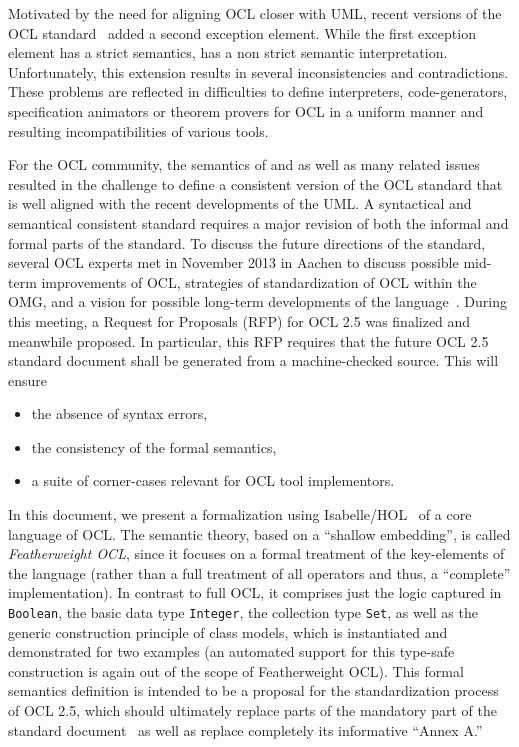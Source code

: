 Motivated by the need for aligning OCL closer with UML, recent
versions of the OCL standard~\cite{omg:ocl:2006,omg:ocl:2012} added a
second exception element.  While the first exception element
 has a strict semantics,  has a non
strict semantic interpretation.  Unfortunately, this extension results
in several inconsistencies and contradictions. These problems are
reflected in difficulties to define interpreters, code-generators,
specification animators or theorem provers for OCL in a uniform manner
and resulting incompatibilities of various tools.

For the OCL community, the semantics of  and
 as well as many related issues resulted in the
challenge to define a consistent version of the OCL standard that is
well aligned with the recent developments of the UML\@. A syntactical
and semantical consistent standard requires a major revision of both
the informal and formal parts of the standard. To discuss the future
directions of the standard, several OCL experts met in November 2013
in Aachen to discuss possible mid-term improvements of OCL, strategies
of standardization of OCL within the OMG, and a vision for possible
long-term developments of the
language~\cite{brucker.ea:summary-aachen:2013}. During this meeting, a
Request for Proposals (RFP) for OCL 2.5 was finalized and meanwhile
proposed. In particular, this RFP requires that the future OCL 2.5
standard document shall be generated from a machine-checked
source. This will ensure
\begin{itemize}
\item the absence of syntax errors,
\item the consistency of the formal semantics,
\item a suite of corner-cases relevant for OCL tool implementors.
\end{itemize}

In this document, we present a formalization using
Isabelle/HOL~\cite{nipkow.ea:isabelle:2002} of a core language of
OCL\@. The semantic theory, based on a ``shallow embedding'', is
called \emph{Featherweight OCL}, since it focuses on a formal
treatment of the key-elements of the language (rather than a full
treatment of all operators and thus, a ``complete''
implementation). In contrast to full OCL, it comprises just the logic
captured in \verb+Boolean+, the basic data type \verb+Integer+, the
collection type \verb+Set+, as well as the generic construction
principle of class models, which is instantiated and demonstrated for
two examples (an automated support for this type-safe construction is
again out of the scope of Featherweight OCL).  This formal semantics
definition is intended to be a proposal for the standardization
process of OCL 2.5, which should ultimately replace parts of the
mandatory part of the standard document~\cite{omg:ocl:2012} as well as
replace completely its informative ``Annex A.''


